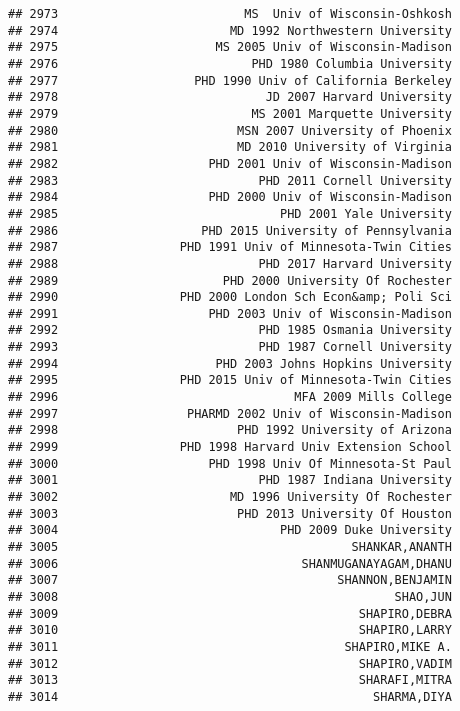 \documentclass[
]{article}
\begin{document}
\begin{verbatim}
## 2973                          MS  Univ of Wisconsin-Oshkosh
## 2974                        MD 1992 Northwestern University
## 2975                      MS 2005 Univ of Wisconsin-Madison
## 2976                           PHD 1980 Columbia University
## 2977                   PHD 1990 Univ of California Berkeley
## 2978                             JD 2007 Harvard University
## 2979                           MS 2001 Marquette University
## 2980                         MSN 2007 University of Phoenix
## 2981                         MD 2010 University of Virginia
## 2982                     PHD 2001 Univ of Wisconsin-Madison
## 2983                            PHD 2011 Cornell University
## 2984                     PHD 2000 Univ of Wisconsin-Madison
## 2985                               PHD 2001 Yale University
## 2986                    PHD 2015 University of Pennsylvania
## 2987                 PHD 1991 Univ of Minnesota-Twin Cities
## 2988                            PHD 2017 Harvard University
## 2989                       PHD 2000 University Of Rochester
## 2990                 PHD 2000 London Sch Econ&amp; Poli Sci
## 2991                     PHD 2003 Univ of Wisconsin-Madison
## 2992                            PHD 1985 Osmania University
## 2993                            PHD 1987 Cornell University
## 2994                      PHD 2003 Johns Hopkins University
## 2995                 PHD 2015 Univ of Minnesota-Twin Cities
## 2996                                 MFA 2009 Mills College
## 2997                  PHARMD 2002 Univ of Wisconsin-Madison
## 2998                         PHD 1992 University of Arizona
## 2999                 PHD 1998 Harvard Univ Extension School
## 3000                     PHD 1998 Univ Of Minnesota-St Paul
## 3001                            PHD 1987 Indiana University
## 3002                        MD 1996 University Of Rochester
## 3003                         PHD 2013 University Of Houston
## 3004                               PHD 2009 Duke University
## 3005                                         SHANKAR,ANANTH
## 3006                                  SHANMUGANAYAGAM,DHANU
## 3007                                       SHANNON,BENJAMIN
## 3008                                               SHAO,JUN
## 3009                                          SHAPIRO,DEBRA
## 3010                                          SHAPIRO,LARRY
## 3011                                        SHAPIRO,MIKE A.
## 3012                                          SHAPIRO,VADIM
## 3013                                          SHARAFI,MITRA
## 3014                                            SHARMA,DIYA

\end{verbatim}
\end{document}
